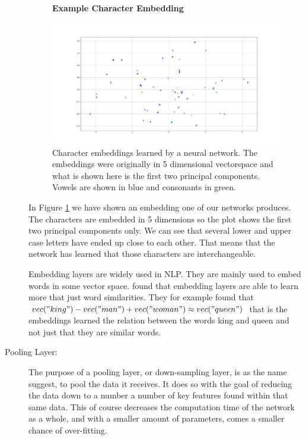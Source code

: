 \begin{description}
        \begin{figure}
            \centering
            \textbf{Example Character Embedding}\par\medskip
            \includegraphics[width=\textwidth]{./pictures/method/example_character_embeddings.png}
            \caption{Character embeddings learned by a neural network. The
                embeddings were originally in 5 dimensional vectorspace and what
                is shown here is the first two principal components. Vowels are
                shown in blue and consonants in green.}
            \label{fig:embeddings}
        \end{figure}

        In Figure \ref{fig:embeddings} we have shown an embedding one of our
        networks produces. The characters are embedded in 5 dimensions so the
        plot shows the first two principal components only. We can see that
        several lower and upper case letters have ended up close to each other.
        That means that the network has learned that those characters are
        interchangeable.

        Embedding layers are widely used in \gls{NLP}. They are mainly used to
        embed words in some vector space. \cite{mikolov2013linguistic} found
        that embedding layers are able to learn more that just word
        similarities. They for example found that $vec("king") - vec("man") +
        vec("woman") \approx vec("queen")$ that is the embeddings learned the
        relation between the words king and queen and not just that they are
        similar words.

    \item[Pooling Layer:]

        The purpose of a pooling layer, or down-sampling layer, is as the name
        suggest, to pool the data it receives. It does so with the goal of
        reducing the data down to a number a number of key features found within
        that same data. This of course decreases the computation time of the
        network as a whole, and with a smaller amount of parameters, comes a 
        smaller chance of over-fitting. 


\end{description}
